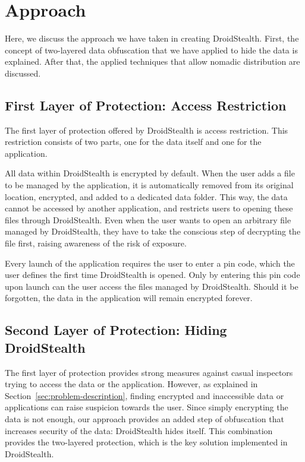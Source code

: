 \section{Approach}
\label{sec:approach}
Here, we discuss the approach we have taken in creating DroidStealth. 
First, the concept of two-layered data obfuscation that we have applied to hide the data is explained.
After that, the applied techniques that allow nomadic distribution are discussed.


\subsection{First Layer of Protection: Access Restriction}
The first layer of protection offered by DroidStealth is access restriction.
This restriction consists of two parts, one for the data itself and one for the application.

All data within DroidStealth is encrypted by default.
When the user adds a file to be managed by the application, it is automatically removed from its original location, encrypted, and added to a dedicated data folder.
This way, the data cannot be accessed by another application, and restricts users to opening these files through DroidStealth.
Even when the user wants to open an arbitrary file managed by DroidStealth, they have to take the conscious step of decrypting the file first, raising awareness of the risk of exposure.

Every launch of the application requires the user to enter a pin code, which the user defines the first time DroidStealth is opened.
Only by entering this pin code upon launch can the user access the files managed by DroidStealth. Should it be forgotten, the data in the application will remain encrypted forever.

\subsection{Second Layer of Protection: Hiding DroidStealth}
The first layer of protection provides strong measures against casual inspectors trying to access the data or the application.
However, as explained in Section~\ref{sec:problem-description}, finding encrypted and inaccessible data or applications can raise suspicion towards the user.
Since simply encrypting the data is not enough, our approach provides an added step of obfuscation that increases security of the data: DroidStealth hides itself.
This combination provides the two-layered protection, which is the key solution implemented in DroidStealth.

